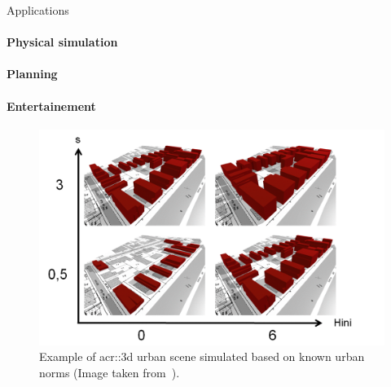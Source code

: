 \documentclass[10pt]{beamer}
\begin{document}
            \begin{frame}{Applications}
                \framesubtitle<1>{Physical simulation}
                \framesubtitle<2>{Planning}
                \framesubtitle<3>{Entertainement}

                {
                    \begin{figure}[H]
                        \centering
                        \includegraphics[width=.8\textwidth]{images/introduction/3d_model_applications/simplu}
                        \caption{Example of \gls{acr::3d} urban scene simulated based on known urban norms (Image taken from~\parencite{brasebin2017stochastic}).}
                    \end{figure}
                }
                {
                    \begin{figure}[H]
                        \centering

\end{figure}}
\end{frame}
\end{document}
